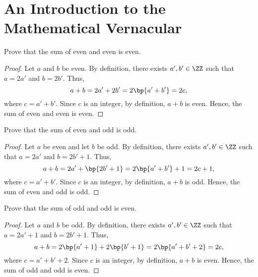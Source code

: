 \section{An Introduction to the Mathematical Vernacular}

\begin{problem}
    Prove that the sum of even and even is even.
\end{problem}
\begin{proof}
    Let $a$ and $b$ be even. By definition, there exists $a', b' \in \ZZ$ such that $a = 2a'$ and $b = 2b'$. Thus, \[a + b = 2a' + 2b' = 2\bp{a' + b'} = 2c,\] where $c = a' + b'$. Since $c$ is an integer, by definition, $a + b$ is even. Hence, the sum of even and even is even.
\end{proof}

\begin{problem}
    Prove that the sum of even and odd is odd.
\end{problem}
\begin{proof}
    Let $a$ be even and let $b$ be odd. By definition, there exists $a', b' \in \ZZ$ such that $a = 2a'$ and $b = 2b' + 1$. Thus, \[a + b = 2a' + \bp{2b' + 1} = 2\bp{a' + b'} + 1 = 2c + 1,\] where $c = a' + b'$. Since $c$ is an integer, by definition, $a + b$ is odd. Hence, the sum of even and odd is odd.
\end{proof}

\begin{problem}
    Prove that the sum of odd and odd is even.
\end{problem}
\begin{proof}
    Let $a$ and $b$ be odd. By definition, there exists $a', b' \in \ZZ$ such that $a = 2a' + 1$ and $b = 2b' + 1$. Thus, \[a + b = 2\bp{a' + 1} + 2\bp{b' + 1} = 2\bp{a' + b' + 2} = 2c,\] where $c = a' + b' + 2$. Since $c$ is an integer, by definition, $a + b$ is even. Hence, the sum of odd and odd is even.
\end{proof}